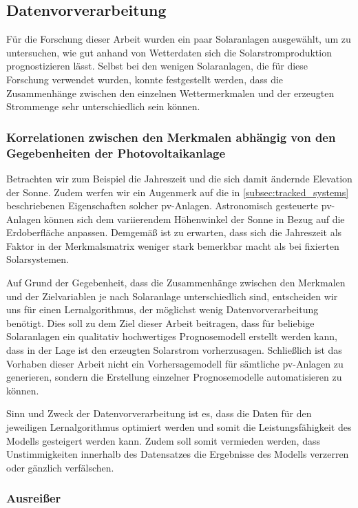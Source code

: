 \documentclass[12pt, a4paper]{article}
\newcommand*{\fullref}[1]{\hyperref[{#1}]{\autoref*{#1} \nameref*{#1}}}
\begin{document}
\subsection{Datenvorverarbeitung}

Für die Forschung dieser Arbeit wurden ein paar Solaranlagen ausgewählt, um zu untersuchen, wie gut anhand von Wetterdaten sich die Solarstromproduktion prognostizieren lässt. Selbst bei den wenigen Solaranlagen, die für diese Forschung verwendet wurden, konnte festgestellt werden, dass die Zusammenhänge zwischen den einzelnen Wettermerkmalen und der erzeugten Strommenge sehr unterschiedlich sein können.

\subsubsection{Korrelationen zwischen den Merkmalen abhängig von den Gegebenheiten der Photovoltaikanlage}

Betrachten wir zum Beispiel die Jahreszeit und die sich damit ändernde Elevation der Sonne. Zudem werfen wir ein Augenmerk auf die in \fullref{subsec:tracked_systems} beschriebenen Eigenschaften solcher \ac{pv}-Anlagen. Astronomisch gesteuerte \ac{pv}-Anlagen können sich dem variierendem Höhenwinkel der Sonne in Bezug auf die Erdoberfläche anpassen. Demgemäß ist zu erwarten, dass sich die Jahreszeit als Faktor in der Merkmalsmatrix weniger stark bemerkbar macht als bei fixierten Solarsystemen. 

Auf Grund der Gegebenheit, dass die Zusammenhänge zwischen den Merkmalen und der Zielvariablen je nach Solaranlage unterschiedlich sind, entscheiden wir uns für einen Lernalgorithmus, der möglichst wenig Datenvorverarbeitung benötigt. Dies soll zu dem Ziel dieser Arbeit beitragen, dass für beliebige Solaranlagen ein qualitativ hochwertiges Prognosemodell erstellt werden kann, dass in der Lage ist den erzeugten Solarstrom vorherzusagen. Schließlich ist das Vorhaben dieser Arbeit nicht ein Vorhersagemodell für sämtliche \ac{pv}-Anlagen zu generieren, sondern die Erstellung einzelner Prognosemodelle automatisieren zu können.

Sinn und Zweck der Datenvorverarbeitung ist es, dass die Daten für den jeweiligen Lernalgorithmus optimiert werden und somit die Leistungsfähigkeit des Modells gesteigert werden kann. Zudem soll somit vermieden werden, dass Unstimmigkeiten innerhalb des Datensatzes die Ergebnisse des Modells verzerren oder gänzlich verfälschen.

\subsubsection{Ausreißer}
\end{document}
